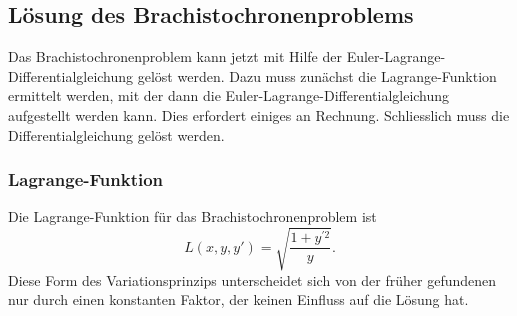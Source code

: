 %
%
%

%
%
\subsection{Lösung des Brachistochronenproblems
\label{buch:variation:eulerlagrange:subsection:brachistochrone}}
Das Brachistochronenproblem kann jetzt mit Hilfe der
Euler-Lagrange-Differentialgleichung gelöst werden.
Dazu muss zunächst die Lagrange-Funktion ermittelt werden,
mit der dann die Euler-Lagrange-Differentialgleichung aufgestellt
werden kann.
Dies erfordert einiges an Rechnung.
Schliesslich muss die Differentialgleichung gelöst werden.

%
%
\subsubsection{Lagrange-Funktion}
Die Lagrange-Funktion für das Brachistochronenproblem ist
\[
L(x,y,y')
=
\sqrt{\frac{1+y^{\prime 2}}{y}}.
\]
Diese Form des Variationsprinzips unterscheidet sich von der früher
gefundenen nur durch einen konstanten Faktor, der keinen Einfluss
auf die Lösung hat.

%
%
